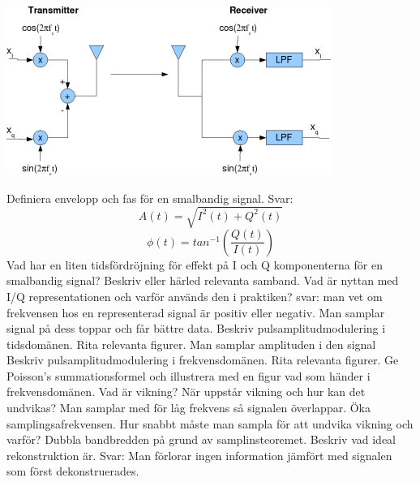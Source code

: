 \documentclass[a4paper,11pt]{article}
\begin{document}
\centerline{
\includegraphics[scale=0.7]{IQ}
}
\newline
\newline
Definiera envelopp och fas för en smalbandig signal.
Svar:
$$A(t)=\sqrt{I^2(t)+ Q^2(t)}$$
$$\phi(t)=tan^{-1}(\frac{Q(t)}{I(t)})$$
\newline
\newline
Vad har en liten tidsfördröjning för effekt på I och Q komponenterna för en smalbandig 
signal?  Beskriv eller härled relevanta samband.
\newline
\newline
Vad är nyttan med I/Q representationen och varför används den i praktiken?
svar: man vet om frekvensen hos en representerad signal är positiv eller negativ. Man samplar signal på dess toppar och får bättre data. 
\newline
\newline
Beskriv pulsamplitudmodulering i tidsdomänen. Rita relevanta figurer.
Man samplar amplituden i den signal
\newline
\newline
Beskriv pulsamplitudmodulering i frekvensdomänen.  Rita relevanta figurer.
\newline
\newline
Ge Poisson's summationsformel och illustrera med en figur vad som händer i 
frekvensdomänen.
\newline
\newline
Vad är vikning? När uppstår vikning och hur kan det undvikas?
Man samplar med för låg frekvens så signalen överlappar. Öka samplingsafrekvensen.
\newline
\newline
Hur snabbt måste man sampla för att undvika vikning och varför?
Dubbla bandbredden på grund av samplinsteoremet. 
\newline
\newline
Beskriv vad ideal rekonstruktion är.
Svar: Man förlorar ingen information jämfört med signalen som först dekonstruerades.
\end{document}
